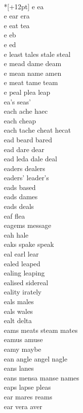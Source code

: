 \vspace{14pt}
\noindent\notextbf{\LargeE}\\*[+12pt]
e ea \\
e ear era  \\
e eat tea  \\
e eb \\
e ed \\
e least tales stale steal    \\
e mead dame deam   \\
e mean name amen   \\
e meat tame team   \\
e peal plea leap   \\
ea's seas' \\
each ache haec\\
each cheap \\
each tache cheat hecat \\
ead beard bared  \\
ead dare dear \\
ead leda dale deal \\
eaders dealers \\
eaders' leader's \\
eads based \\
eads dames \\
eads deals \\
eaf flea \\
eagems message \\
eah hale \\
eaks spake speak \\
eal earl lear \\
ealed leaped \\
ealing leaping \\
ealised sidereal \\
eality irately \\
eals males \\
eals wales \\
ealt delta \\
eams meats steam mates \\
eamus amuse\\
eamy maybe \\
ean angle angel nagle  \\
eans lanes \\
eans mensa manse names \\
eaps lapse pleas \\
ear mares reams  \\
ear vera aver \\
